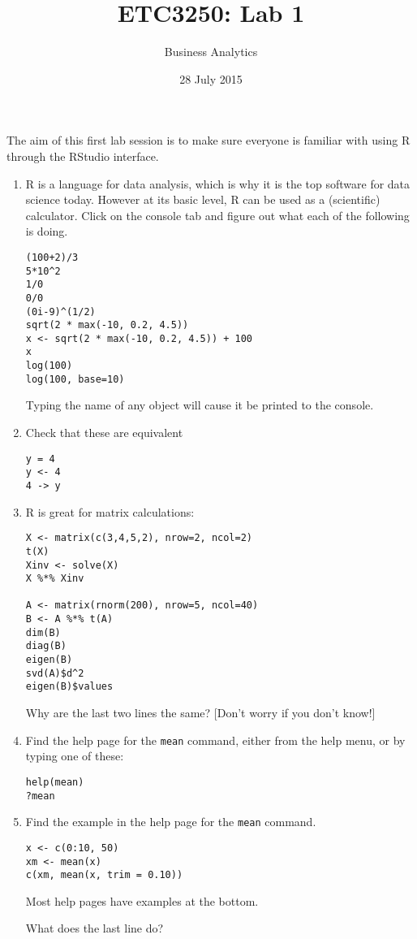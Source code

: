\documentclass[11pt]{article}
\title{ETC3250: Lab 1}
\author{Business Analytics}
\date{28 July 2015}
\begin{document}
\maketitle

The aim of this first lab session is to make sure everyone is familiar with using R through the RStudio interface.


\begin{enumerate}
\item R is a language for data analysis, which is why it is the top software for data science today. However at its basic level, R can be used as a (scientific) calculator. Click on the console tab and figure out what each of the following is doing.
\begin{verbatim}
(100+2)/3
5*10^2 
1/0
0/0
(0i-9)^(1/2)
sqrt(2 * max(-10, 0.2, 4.5)) 
x <- sqrt(2 * max(-10, 0.2, 4.5)) + 100
x
log(100)
log(100, base=10) 
\end{verbatim}
Typing the name of any object will cause it be printed to the console.

\item Check that these are equivalent
\begin{verbatim}
y = 4
y <- 4
4 -> y
\end{verbatim}

\item R is great for matrix calculations:
\begin{verbatim}
X <- matrix(c(3,4,5,2), nrow=2, ncol=2)
t(X)
Xinv <- solve(X)
X %*% Xinv

A <- matrix(rnorm(200), nrow=5, ncol=40)
B <- A %*% t(A)
dim(B)
diag(B)
eigen(B)
svd(A)$d^2
eigen(B)$values
\end{verbatim}
Why are the last two lines the same? [Don't worry if you don't know!]

\item Find the help page for the \verb|mean| command, either from the help menu, or by typing one of these:
\begin{verbatim}
help(mean)
?mean 
\end{verbatim}

\item Find the example in the help page for the \verb|mean| command.
\begin{verbatim}
x <- c(0:10, 50) 
xm <- mean(x)
c(xm, mean(x, trim = 0.10))
\end{verbatim}
Most help pages have examples at the bottom.

What does the last line do?



\end{enumerate}
\end{document}
